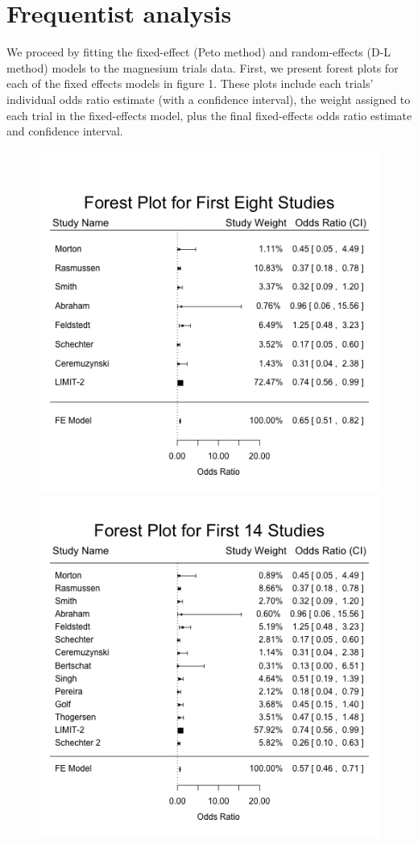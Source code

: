 \documentclass[fleqn,10pt]{SelfArx} %
\begin{document}
\section{Frequentist analysis}

We proceed by fitting the fixed-effect (Peto method) and random-effects (D-L method) models to the magnesium trials data. First, we present forest plots for each of the fixed effects models in figure 1. These plots include each trials' individual odds ratio estimate (with a confidence interval), the weight assigned to each trial in the fixed-effects model, plus the final fixed-effects odds ratio estimate and confidence interval.
\begin{center}
\begin{figure}
\includegraphics[scale=0.45]{./../figures/forest_early.png}
\\
\includegraphics[scale=0.45]{./../figures/forest_middle.png}

\end{figure}
\end{center}
\end{document}
